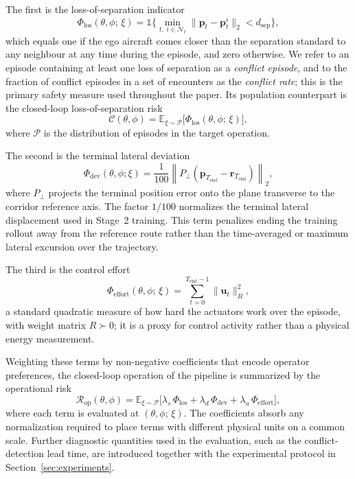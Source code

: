 \documentclass[11pt]{article}
\theoremstyle{plain}
\theoremstyle{definition}
\newcommand{\E}{\mathbb{E}}
\newcommand{\bu}{\bm{u}}
\begin{document}
The first is the loss-of-separation indicator
\begin{equation}
	\label{eq:phi-los}
	\Phi_{\mathrm{los}}(\theta, \phi;\, \xi)
	= \mathbb{1}\Big\{ \min_{t,\; i \in \mathcal{N}_t}
	\big\| \bm{p}_t - \bm{p}^i_t \big\|_2 < d_{\mathrm{sep}} \Big\},
\end{equation}
which equals one if the ego aircraft comes closer than the separation
standard to any neighbour at any time during the episode, and zero
otherwise. We refer to an episode containing at least one loss of
separation as a \emph{conflict episode}, and to the fraction of conflict
episodes in a set of encounters as the \emph{conflict rate}; this is the
primary safety measure used throughout the paper. Its population
counterpart is the closed-loop loss-of-separation risk
\begin{equation}
	\label{eq:conflict-risk}
	\mathcal{C}(\theta, \phi)
	= \E_{\xi \sim \mathcal{P}}\big[ \Phi_{\mathrm{los}}(\theta, \phi;\, \xi) \big],
\end{equation}
where $\mathcal{P}$ is the distribution of episodes in the target
operation.
 
The second is the terminal lateral deviation
\begin{equation}
    \label{eq:phi-dev}
    \Phi_{\mathrm{dev}}(\theta,\phi;\xi)
    =
    \frac{1}{100}
    \left\|
    P_{\perp}
    \left(
    \bm{p}_{T_{\mathrm{end}}}
    -
    \bm{r}_{T_{\mathrm{end}}}
    \right)
    \right\|_2 ,
\end{equation}
where $P_{\perp}$ projects the terminal position error onto the plane
transverse to the corridor reference axis. The factor $1/100$
normalizes the terminal lateral displacement used in Stage~2 training.
This term penalizes ending the training rollout away from the reference
route rather than the time-averaged or maximum lateral excursion over
the trajectory.

The third is the control effort
\begin{equation}
	\label{eq:phi-effort}
	\Phi_{\mathrm{effort}}(\theta, \phi;\, \xi)
	= \sum_{t=0}^{T_{\mathrm{end}}-1} \| \bu_t \|_{R}^{2},
\end{equation}
a standard quadratic measure of how hard the actuators work over the
episode, with weight matrix $R \succ 0$; it is a proxy for control
activity rather than a physical energy measurement.
 
Weighting these terms by non-negative coefficients that encode
operator preferences, the closed-loop operation of the pipeline is
summarized by the operational risk
\begin{equation}
	\label{eq:operational-risk}
	\mathcal{R}_{\mathrm{op}}(\theta, \phi)
	= \E_{\xi \sim \mathcal{P}}\!\Big[
		\lambda_{s}\, \Phi_{\mathrm{los}}
		+ \lambda_{d}\, \Phi_{\mathrm{dev}}
		+ \lambda_{u}\, \Phi_{\mathrm{effort}}
		\Big],
\end{equation}
where each term is evaluated at $(\theta, \phi;\, \xi)$. The
coefficients absorb any normalization required to place terms with
different physical units on a common scale. Further diagnostic
quantities used in the evaluation, such as the conflict-detection lead
time, are introduced together with the experimental protocol in
Section~\ref{sec:experiments}.
 
\end{document}
